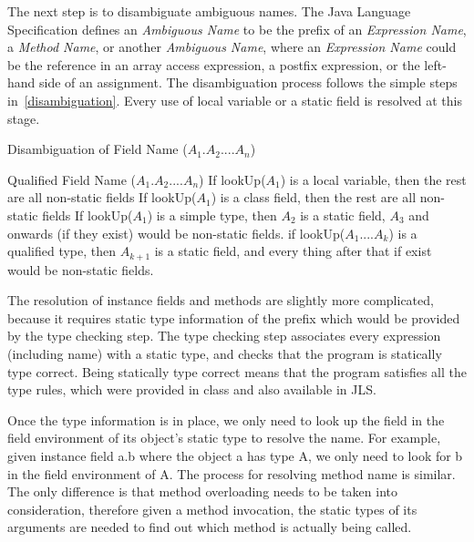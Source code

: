 \documentclass[a4paper, notitlepage]{report}
\begin{document}
The next step is to disambiguate ambiguous names. The Java Language Specification defines an \emph{Ambiguous Name} to be the prefix of an \emph{Expression Name}, a \emph{Method Name}, or another \emph{Ambiguous Name}, where an \emph{Expression Name} could be the reference in an array access expression, a postfix expression, or the left-hand side of an assignment. The disambiguation process follows the simple steps in~\ref{disambiguation}. Every use of local variable or a static field is resolved at this stage.

\begin{algorithm}                      %
\caption{Disambiguation of Field Name ($A_1.A_2....A_n$)}          %
\label{disambiguation}                           %
\begin{algorithmic}[1]
\Require Qualified Field Name ($A_1.A_2....A_n$)
\State If lookUp($A_1$) is a local variable, then the rest are all non-static fields 
\State If lookUp($A_1$) is a  class field, then the rest are all non-static fields
\State If lookUp($A_1$) is a simple type, then $A_2$ is a static field, $A_3$ and onwards (if they exist) would be non-static fields.
\State if lookUp($A_1....A_k$) is a qualified type, then $A_{k+1}$ is a static field, and every thing after that if exist would be non-static fields.

\end{algorithmic}
\end{algorithm}

The resolution of instance fields and methods are slightly more complicated, because it requires static type information of the prefix which would be provided by the type checking step. The type checking step associates every expression (including name) with a static type, and checks that the program is statically type correct. Being statically type correct means that the program satisfies all the type rules, which were provided in class and also available in JLS. 

Once the type information is in place, we only need to look up the field in the field environment of its object's static type to resolve the name. For example, given instance field a.b where the object a has type A, we only need to look for b in the field environment of A. The process for resolving method name is similar. The only difference is that method overloading needs to be taken into consideration, therefore given a method invocation, the static types of its arguments are needed to find out which method is actually being called.
\end{document}
